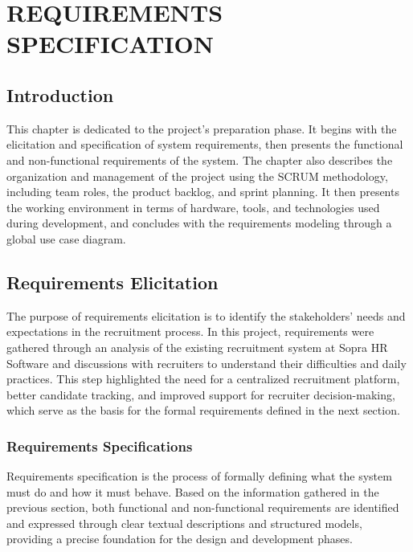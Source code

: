 ﻿\chapter{REQUIREMENTS SPECIFICATION}
\thispagestyle{MyStyle}
\minitoc
\newpage
\thispagestyle{MyStyle}

\section*{Introduction}

This chapter is dedicated to the project's preparation phase. It begins with the elicitation and specification of system requirements, then presents the functional and non-functional requirements of the system. The chapter also describes the organization and management of the project using the SCRUM methodology, including team roles, the product backlog, and sprint planning. It then presents the working environment in terms of hardware, tools, and technologies used during development, and concludes with the requirements modeling through a global use case diagram.

\section{Requirements Elicitation}

The purpose of requirements elicitation is to identify the stakeholders' needs and expectations in the recruitment process. In this project, requirements were gathered through an analysis of the existing recruitment system at Sopra HR Software and discussions with recruiters to understand their difficulties and daily practices. This step highlighted the need for a centralized recruitment platform, better candidate tracking, and improved support for recruiter decision-making, which serve as the basis for the formal requirements defined in the next section.

\subsection{Requirements Specifications}

Requirements specification is the process of formally defining what the system must do and how it must behave. Based on the information gathered in the previous section, both functional and non-functional requirements are identified and expressed through clear textual descriptions and structured models, providing a precise foundation for the design and development phases.

